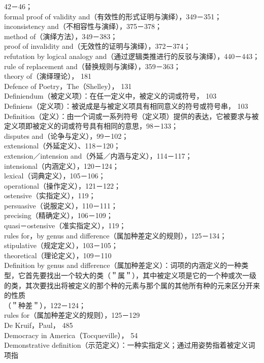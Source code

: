 42－46；\\
formal proof of validity and（有效性的形式证明与演绎），349－351；\\
inconsistency and（不相容性与演绎），375－378；\\
method of（演绎方法），349－383；\\
proof of invalidity and（无效性的证明与演绎），372－374；\\
refutation by logical analogy and（通过逻辑类推进行的反驳与演绎），440－443；\\
rule of replacement and（替换规则与演绎），359－363；\\
theory of（演绎理论）， 181\\
Defence of Poetry，The（Shelley）， 131\\
Definiendum（被定义项）：在任一定义中，被定义的词或符号， 103\\
Definiens（定义项）：被说成是与被定义项具有相同意义的符号或符号串， 103\\
Definition（定义）：由一个词或一系列符号（定义项）提供的表达，它被要求与被定义项即被定义的词或符号具有相同的意思，98－133；\\
disputes and（论争与定义），99－102；\\
extensional（外延定义）、118－120；\\
extension／intension and（外延／内涵与定义），114－117；\\
intensional（内涵定义），120－124；\\
lexical（词典定义），105－106；\\
operational（操作定义），121－122；\\
ostensive（实指定义），119；\\
persuasive（说服定义），110－111；\\
precising（精确定义），106－109；\\
quasi－ostensive（准实指定义），119；\\
rules for，by genus and difference（属加种差定义的规则），125－134；\\
stipulative（规定定义），103－105；\\
theoretical（理论定义），109－110\\
Definition by genus and difference（属加种差定义）：词项的内涵定义的一种类型，它首先要找出一个较大的类（＂属＂），其中被定义项是它的一个种或次一级的类，其次要找出将被定义的那个种的元素与那个属的其他所有种的元来区分开来的性质\\
（＂种差＂），122－124；\\
rules for（属加种差定义的规则），125－129\\
De Kruif，Paul， 485\\
Democracy in America（Tocqueville）， 54\\
Demonstrative definition（示范定义）：一种实指定义；通过用姿势指着被定义词项指

